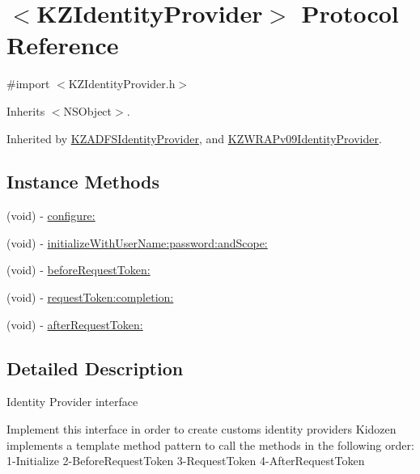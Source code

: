 \hypertarget{protocol_k_z_identity_provider-p}{\section{$<$K\-Z\-Identity\-Provider$>$ Protocol Reference}
\label{protocol_k_z_identity_provider-p}
}


{\ttfamily \#import $<$K\-Z\-Identity\-Provider.\-h$>$}



Inherits $<$\-N\-S\-Object$>$.



Inherited by \hyperlink{interface_k_z_a_d_f_s_identity_provider}{K\-Z\-A\-D\-F\-S\-Identity\-Provider}, and \hyperlink{interface_k_z_w_r_a_pv09_identity_provider}{K\-Z\-W\-R\-A\-Pv09\-Identity\-Provider}.

\subsection*{Instance Methods}
\begin{DoxyCompactItemize}
\item 
(void) -\/ \hyperlink{protocol_k_z_identity_provider-p_a0bf56da3b677bf584410f19148acb1d9}{configure\-:}
\item 
(void) -\/ \hyperlink{protocol_k_z_identity_provider-p_a3541d97b26c6feb3e416b4c5e26bce33}{initialize\-With\-User\-Name\-:password\-:and\-Scope\-:}
\item 
(void) -\/ \hyperlink{protocol_k_z_identity_provider-p_a1ddebe0e2fe01626644834cbefd50103}{before\-Request\-Token\-:}
\item 
(void) -\/ \hyperlink{protocol_k_z_identity_provider-p_a370ad854c754f567c314c346a9cca5e9}{request\-Token\-:completion\-:}
\item 
(void) -\/ \hyperlink{protocol_k_z_identity_provider-p_ac618432929da77b50705b1a97b64e632}{after\-Request\-Token\-:}
\end{DoxyCompactItemize}


\subsection{Detailed Description}
Identity Provider interface

Implement this interface in order to create customs identity providers Kidozen implements a template method pattern to call the methods in the following order\-: 1-\/\-Initialize 2-\/\-Before\-Request\-Token 3-\/\-Request\-Token 4-\/\-After\-Request\-Token

